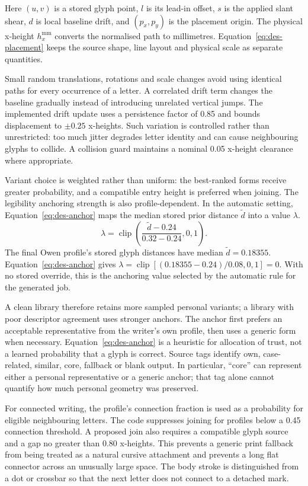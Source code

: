 Here $(u,v)$ is a stored glyph point, $l$ is its lead-in offset, $s$ is the applied slant shear, $d$ is local baseline drift, and $(p_x,p_y)$ is the placement origin. The physical x-height $h_x^{\mathrm{mm}}$ converts the normalised path to millimetres. Equation~\ref{eq:des-placement} keeps the source shape, line layout and physical scale as separate quantities.

Small random translations, rotations and scale changes avoid using identical paths for every occurrence of a letter. A correlated drift term changes the baseline gradually instead of introducing unrelated vertical jumps. The implemented drift update uses a persistence factor of 0.85 and bounds displacement to $\pm0.25$ x-heights. Such variation is controlled rather than unrestricted: too much jitter degrades letter identity and can cause neighbouring glyphs to collide. A collision guard maintains a nominal 0.05 x-height clearance where appropriate.

Variant choice is weighted rather than uniform: the best-ranked forms receive greater probability, and a compatible entry height is preferred when joining. The legibility anchoring strength is also profile-dependent. In the automatic setting, Equation~\ref{eq:des-anchor} maps the median stored prior distance $\widetilde d$ into a value $\lambda$.
\begin{equation}
\lambda=\operatorname{clip}\left(\frac{\widetilde d-0.24}{0.32-0.24},0,1\right).
\label{eq:des-anchor}
\end{equation}
The final Owen profile's stored glyph distances have median $\widetilde d=0.18355$. Equation~\ref{eq:des-anchor} gives $\lambda=\operatorname{clip}[(0.18355-0.24)/0.08,0,1]=0$. With no stored override, this is the anchoring value selected by the automatic rule for the generated job.

A clean library therefore retains more sampled personal variants; a library with poor descriptor agreement uses stronger anchors. The anchor first prefers an acceptable representative from the writer's own profile, then uses a generic form when necessary. Equation~\ref{eq:des-anchor} is a heuristic for allocation of trust, not a learned probability that a glyph is correct. Source tags identify own, case-related, similar, core, fallback or blank output. In particular, ``core'' can represent either a personal representative or a generic anchor; that tag alone cannot quantify how much personal geometry was preserved.

For connected writing, the profile's connection fraction is used as a probability for eligible neighbouring letters. The code suppresses joining for profiles below a 0.45 connection threshold. A proposed join also requires a compatible glyph source and a gap no greater than 0.80 x-heights. This prevents a generic print fallback from being treated as a natural cursive attachment and prevents a long flat connector across an unusually large space. The body stroke is distinguished from a dot or crossbar so that the next letter does not connect to a detached mark.

